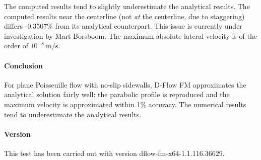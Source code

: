 The computed results tend to slightly underestimate the analytical results. The computed results near the centerline (not \emph{at} the centerline, due to staggering) differs -0.3507\% from its analytical counterpart. This issue is currently under investigation by Mart Borsboom. The maximum absolute lateral velocity is of the order of $10^{-8}~\textrm{m/s}$.




\paragraph*{Conclusion}
For plane Poisseuille flow with no-slip sidewalls, D-Flow FM approximates the analytical solution fairly well: the parabolic profile is reproduced and the maximum velocity is approximated within 1\% accuracy. The numerical results tend to underestimate the analytical results.



\paragraph*{Version}
This test has been carried out with version dflow-fm-x64-1.1.116.36629.


